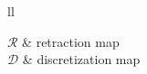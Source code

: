 \begin{symbols}{ll} %

$\mathcal{R}$ & retraction map \\
$\mathcal{D}$ & discretization map \\

\end{symbols}




\newcommand{\listacronymname}{List of Acronyms}

\glsresetall
\printglossary[title=\listacronymname,type=\acronymtype,style=long]


\mainmatter %
\pagestyle{thesis} %
